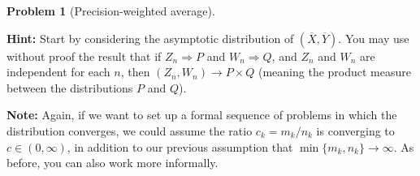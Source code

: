 \documentclass{article}
\newcommand{\EE}{\mathbb{E}}
\newcommand{\simiid}{\overset{\text{i.i.d.}}{\sim}}
\theoremstyle{definition}
\newtheorem{problem}{Problem}
\begin{document}
\begin{problem}[Precision-weighted average]
\begin{enumerate}[(a)]
{\bf Hint:} Start by considering the asymptotic distribution of $(\overline X, \overline Y)$. You may use without proof the result that if $Z_n \Rightarrow P$ and $W_n \Rightarrow Q$, and $Z_n$ and $W_n$ are independent for each $n$, then $(Z_n,W_n) \to P \times Q$ (meaning the product measure between the distributions $P$ and $Q$).

{\bf Note:} Again, if we want to set up a formal sequence of problems in which the distribution converges, we could assume the ratio $c_k = m_k/n_k$ is converging to $c \in (0,\infty)$, in addition to our previous assumption that $\min \{m_k,n_k\}\to\infty$. As before, you can also work more informally.



\end{enumerate}

\end{problem}





% 


% 


\end{document}

